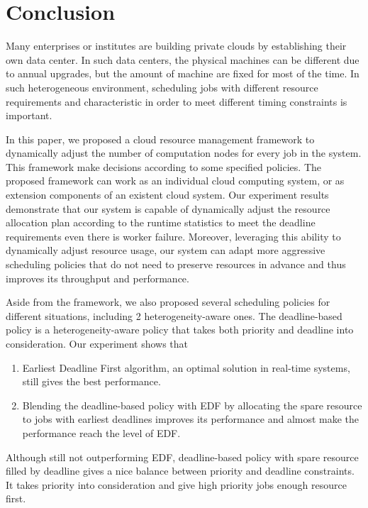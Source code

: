 \chapter{Conclusion}\label{sec:conclusion}

Many enterprises or institutes are building private clouds by
establishing their own data center.
In such data centers, the physical machines can be different due to 
annual upgrades,  but the amount of machine are fixed for most of the 
time.
In such heterogeneous environment, scheduling jobs with different 
resource requirements and characteristic in order to meet different 
timing constraints is important.

In this paper, we proposed a cloud resource management framework to
dynamically adjust the number of computation nodes for every job in the
system.
This framework make decisions according to some specified policies.
The proposed framework can work as an individual cloud computing system,
or as extension components of an existent cloud system.
Our experiment results demonstrate that our system is capable of
dynamically adjust the resource allocation plan according to the runtime
statistics to meet the deadline requirements even there is worker
failure.
Moreover, leveraging this ability to dynamically adjust resource usage,
our system can adapt more aggressive scheduling policies that do not
need to preserve resources in advance and thus improves its throughput
and performance.

Aside from the framework, we also proposed several scheduling policies
for different situations, including 2 heterogeneity-aware ones.
The deadline-based policy is a heterogeneity-aware policy that takes
both priority and deadline into consideration.
Our experiment shows that
\begin{enumerate}
  \item Earliest Deadline First algorithm, an optimal solution in
    real-time systems, still gives the best performance.
  \item Blending the deadline-based policy with EDF by allocating the
    spare resource to jobs with earliest deadlines improves its
    performance and almost make the performance reach the level of EDF.
\end{enumerate}
Although still not outperforming EDF, deadline-based policy with spare
resource filled by deadline gives a nice balance between priority and
deadline constraints.
It takes priority into consideration and give high priority jobs enough
resource first.
